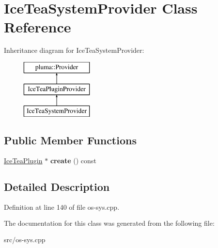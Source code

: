 \hypertarget{class_ice_tea_system_provider}{}\section{Ice\+Tea\+System\+Provider Class Reference}
\label{class_ice_tea_system_provider}
Inheritance diagram for Ice\+Tea\+System\+Provider\+:\begin{figure}[H]
\begin{center}
\leavevmode
\includegraphics[height=3.000000cm]{class_ice_tea_system_provider}
\end{center}
\end{figure}
\subsection*{Public Member Functions}
\begin{DoxyCompactItemize}
\item 
\hyperlink{class_ice_tea_plugin}{Ice\+Tea\+Plugin} $\ast$ {\bfseries create} () const \hypertarget{class_ice_tea_system_provider_a5da254806038041965e7ac4751edf152}{}\label{class_ice_tea_system_provider_a5da254806038041965e7ac4751edf152}

\end{DoxyCompactItemize}


\subsection{Detailed Description}


Definition at line 140 of file os-\/sys.\+cpp.



The documentation for this class was generated from the following file\+:\begin{DoxyCompactItemize}
\item 
src/os-\/sys.\+cpp\end{DoxyCompactItemize}
